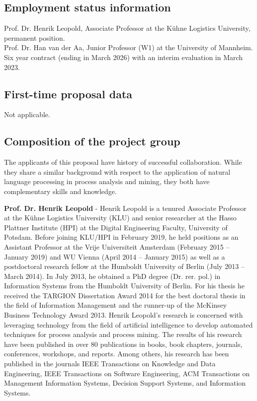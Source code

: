 

\subsection{Employment status information}

Prof. Dr. Henrik Leopold, Associate Professor at the Kühne Logistics University, permanent position.\\
Prof. Dr. Han van der Aa, Junior Professor (W1) at the University of Mannheim. Six year contract (ending in March 2026) with an interim evaluation in March 2023.

\subsection{First-time proposal data}

Not applicable.

\subsection{Composition of the project group}



The applicants of this proposal have history of successful collaboration. While they share a similar background with respect to the application of natural language processing in process analysis and mining, they both have complementary skills and knowledge. 

\textbf{Prof. Dr. Henrik Leopold} - Henrik Leopold is a tenured Associate Professor at the K\"uhne Logistics University (KLU) and senior researcher at the Hasso Plattner Institute (HPI) at the Digital Engineering Faculty, University of Potsdam. Before joining KLU/HPI in February 2019, he held positions as an Assistant Professor at the Vrije Universiteit Amsterdam (February 2015 – January 2019) and WU Vienna (April 2014 – January 2015) as well as a postdoctoral research fellow at the Humboldt University of Berlin (July 2013 – March 2014). In July 2013, he obtained a PhD degree (Dr. rer. pol.) in Information Systems from the Humboldt University of Berlin. For his thesis he received the TARGION Dissertation Award 2014 for the best doctoral thesis in the field of Information Management and the runner-up of the McKinsey Business Technology Award 2013. Henrik Leopold's research is concerned with leveraging technology from the field of artificial intelligence to develop automated techniques for process analysis and process mining. The results of his research have been published in over 80 publications in books, book chapters, journals, conferences, workshops, and reports. Among others, his research has been published in the journals IEEE Transactions on Knowledge and Data Engineering, IEEE Transactions on Software Engineering, ACM Transactions on Management Information Systems, Decision Support Systems, and Information Systems. 

